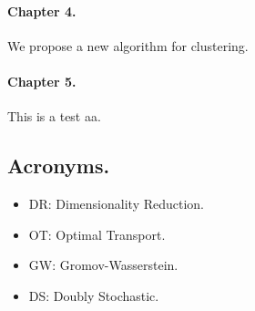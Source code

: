 \paragraph{Chapter 4.} We propose a new algorithm for clustering.


\paragraph{Chapter 5.} 

\text


\begin{rem2}
	This is a test aa.
\end{rem2}




\subsection*{Acronyms.}
\begin{itemize}
	\item DR: Dimensionality Reduction.
	\item OT: Optimal Transport.
	\item GW: Gromov-Wasserstein.
	\item DS: Doubly Stochastic.
\end{itemize}
